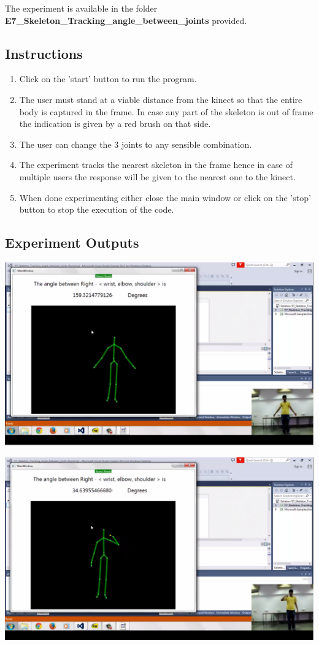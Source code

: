 \begin{flushleft}
\medskip
The experiment is available in the folder \textbf{E7\_Skeleton\_Tracking\_angle\_between\_joints} provided.
\medskip

\subsection{\textbf{ Instructions}}
\begin{enumerate}
\item Click on the 'start' button to run the program.
\item The user must stand at a viable distance from the kinect so that the entire body is captured in the frame. In case any part of the skeleton is out of frame the indication is given by a red brush on that side.
\item The user can change the 3 joints to any sensible combination.
\item The experiment tracks the nearest skeleton in the frame hence in case of multiple users the response will be given to the nearest one to the kinect.
\item When done experimenting either close the main window or click on the 'stop' button to stop the execution of the code.

\end{enumerate}

\medskip
\subsection{\textbf{ Experiment Outputs}}
\includegraphics[scale = 0.5]{e71}

\medskip
\includegraphics[scale = 0.5]{e72}
\medskip

\end{flushleft}
